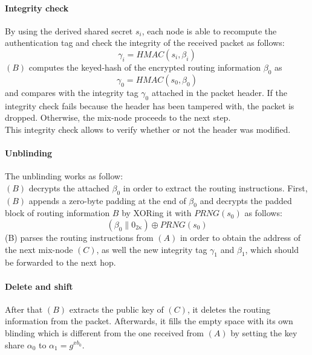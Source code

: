 \paragraph{Integrity check}
By using the derived shared secret $s_i$, each node is able to recompute the authentication tag and check the integrity of the received packet as follows: $$\gamma_i=HMAC(s_i,\beta_i)$$
$(B)$ computes the keyed-hash of the encrypted routing information $\beta_0$ as $$\gamma_0=HMAC(s_0,\beta_0)$$ and compares with the integrity tag $\gamma_0$ attached in the packet header. If the integrity check fails because the header has been tampered with, the packet is dropped. Otherwise, the mix-node proceeds to the next step.
\\This integrity check allows to verify whether or not the header was modified.

\paragraph{Unblinding} 
The unblinding works as follow:
\\$(B)$ decrypts the attached $\beta_0$ in order to extract the routing instructions. First, $(B)$ appends a zero-byte padding at the end of $\beta_0$ and decrypts the padded block of routing information $B$ by XORing it with $PRNG(s_{0})$ as follows:
$$(\beta_0\|0_{2\kappa})\oplus PRNG(s_{0})$$
(B) parses the routing instructions from $(A)$ in order to obtain the address of the next mix-node $(C)$, as well the new integrity tag $\gamma_1$ and $\beta_1$, which should be forwarded to the next hop.
\paragraph{Delete and shift}
After that $(B)$ extracts the public key of $(C)$, it deletes the routing information from the packet. Afterwards, it fills the empty space with its own blinding which is different from the one received from $(A)$ by setting the key share $\alpha_0$ to $\alpha_1=g^{xb_0}$.

